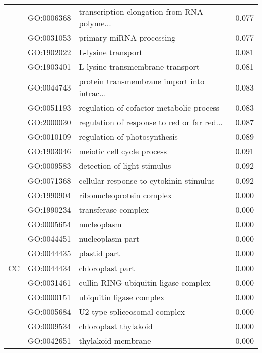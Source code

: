 \begin{longtable}{lllr}
   & GO:0006368 &  transcription elongation from RNA polyme... &         0.077 \\
   & GO:0031053 &                     primary miRNA processing &         0.077 \\
   & GO:1902022 &                           L-lysine transport &         0.081 \\
   & GO:1903401 &             L-lysine transmembrane transport &         0.081 \\
   & GO:0044743 &  protein transmembrane import into intrac... &         0.083 \\
   & GO:0051193 &     regulation of cofactor metabolic process &         0.083 \\
   & GO:2000030 &  regulation of response to red or far red... &         0.087 \\
   & GO:0010109 &                 regulation of photosynthesis &         0.089 \\
   & GO:1903046 &                   meiotic cell cycle process &         0.091 \\
   & GO:0009583 &                  detection of light stimulus &         0.092 \\
   & GO:0071368 &      cellular response to cytokinin stimulus &         0.092 \\
\cline{1-4}
\multirow{56}{*}{CC} & GO:1990904 &                    ribonucleoprotein complex &         0.000 \\
   & GO:1990234 &                          transferase complex &         0.000 \\
   & GO:0005654 &                                  nucleoplasm &         0.000 \\
   & GO:0044451 &                             nucleoplasm part &         0.000 \\
   & GO:0044435 &                                 plastid part &         0.000 \\
   & GO:0044434 &                             chloroplast part &         0.000 \\
   & GO:0031461 &         cullin-RING ubiquitin ligase complex &         0.000 \\
   & GO:0000151 &                     ubiquitin ligase complex &         0.000 \\
   & GO:0005684 &                 U2-type spliceosomal complex &         0.000 \\
   & GO:0009534 &                        chloroplast thylakoid &         0.000 \\
   & GO:0042651 &                           thylakoid membrane &         0.000 \\

\end{longtable}
